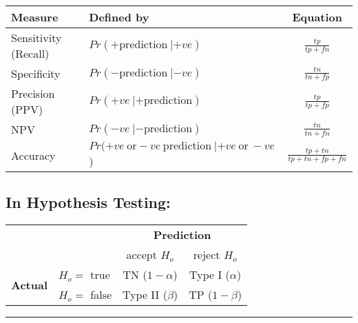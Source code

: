 \documentclass[11pt]{article}
\begin{document}
\renewcommand{\arraystretch}{1.5}
\setlength{\tabcolsep}{0.5cm}
\begin{tabular}{| l | l | c |}
  \hline
  \textbf{Measure}   &  \textbf{Defined by}        &  \textbf{Equation} \\
  \hline
  Sensitivity (Recall)  & $Pr(+ \text{prediction}\ | +ve)$    & $\frac{tp}{tp + fn}$ \\
  Specificity           & $Pr(- \text{prediction}\ | -ve)$    & $\frac{tn}{tn + fp}$ \\
  Precision (PPV)       & $Pr(+ve\ | + \text{prediction})$    & $\frac{tp}{tp + fp}$ \\
  NPV                   & $Pr(-ve\ | - \text{prediction})$    & $\frac{tn}{tn + fn}$ \\
  Accuracy              & $Pr(+ve\ \text{or} -ve\ \text{prediction}\ | +ve\ \text{or}\ -ve$) & $\frac{tp+tn}{tp + tn + fp + fn}$ \\
  \hline
\end{tabular}


\subsection*{In Hypothesis Testing:}

\renewcommand{\arraystretch}{1.5}
\setlength{\tabcolsep}{0.5cm}
\begin{flushleft}
\begin{tabular}{l l | c | c |}
  \multicolumn{2}{c}{} &  \multicolumn{2}{c}{\textbf{Prediction}} \\[7pt]
  & \multicolumn{1}{c}{} & \multicolumn{1}{c}{accept $H_o$} & \multicolumn{1}{c}{reject $H_o$} \\
  \cline{3-4}
  \multirow{2}{*}{\textbf{Actual}}  & $H_o=$ true    & TN ($1-\alpha$)      &  Type I ($\alpha$) \\
\cline{3-4}
                        & $H_o=$ false    & Type II ($\beta$)    &  TP ($1-\beta$)  \\
  \cline{3-4}
\end{tabular}
\end{flushleft}

\def \hzline{\rule[0mm]{\textwidth}{1pt}}
\vfill \noindent \hzline \\ 
\end{document}
